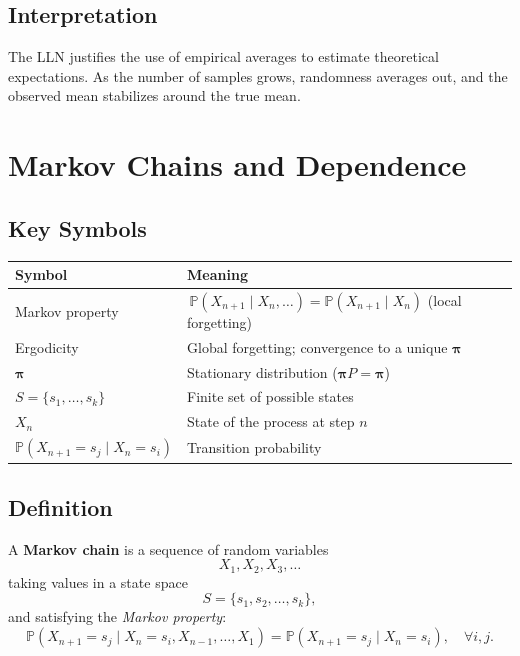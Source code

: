 \subsection{Interpretation}

The LLN justifies the use of empirical averages to estimate theoretical expectations. As the number of samples grows, randomness averages out, and the observed mean stabilizes around the true mean.



\section{Markov Chains and Dependence}

\subsection{Key Symbols}


\begin{center}
\begin{tabular}{ll}
\toprule
\textbf{Symbol} & \textbf{Meaning} \\
\midrule
Markov property & $\,\mathbb{P}(X_{n+1}\!\mid X_n,\dots)=\mathbb{P}(X_{n+1}\!\mid X_n)$ (local forgetting) \\
Ergodicity & Global forgetting; convergence to a unique $\boldsymbol{\pi}$ \\
$\boldsymbol{\pi}$ & Stationary distribution ($\boldsymbol{\pi}P=\boldsymbol{\pi}$) \\
$S = \{s_1, \dots, s_k\}$ & Finite set of possible states \\
$X_n$ & State of the process at step $n$ \\
$\mathbb{P}(X_{n+1}=s_j \mid X_n=s_i)$ & Transition probability \\
\bottomrule
\end{tabular}
\end{center}


\subsection{Definition}

A \textbf{Markov chain} is a sequence of random variables
\[
X_1, X_2, X_3, \dots
\]
taking values in a state space
\[
S = \{ s_1, s_2, \dots, s_k \},
\]
and satisfying the \emph{Markov property}:
\[
\mathbb{P}(X_{n+1} = s_j \mid X_n = s_i, X_{n-1}, \dots, X_1)
= \mathbb{P}(X_{n+1} = s_j \mid X_n = s_i),
\quad \forall i,j.
\]

